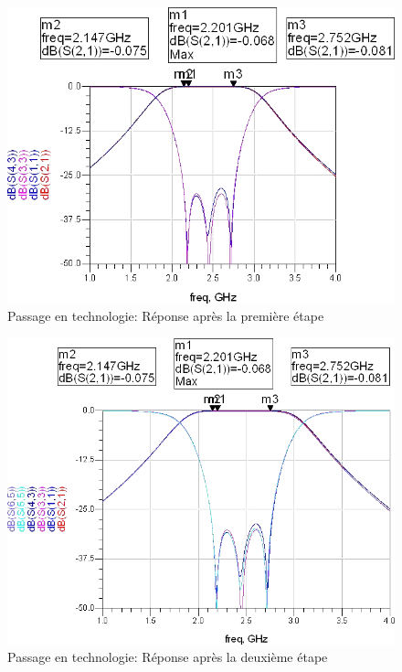 \documentclass[10pt]{article}
\begin{document}
\begin{figure}
    \begin{center}
        \includegraphics[width=14cm]{p21_Simu}
    \end{center}
    \caption{Passage en technologie: Réponse après la première étape}
\end{figure}
\begin{figure}
    \begin{center}
        \includegraphics[width=14cm]{p21_Simu2}
    \end{center}
    \caption{Passage en technologie: Réponse après la deuxième étape}
\end{figure}
\end{document}
